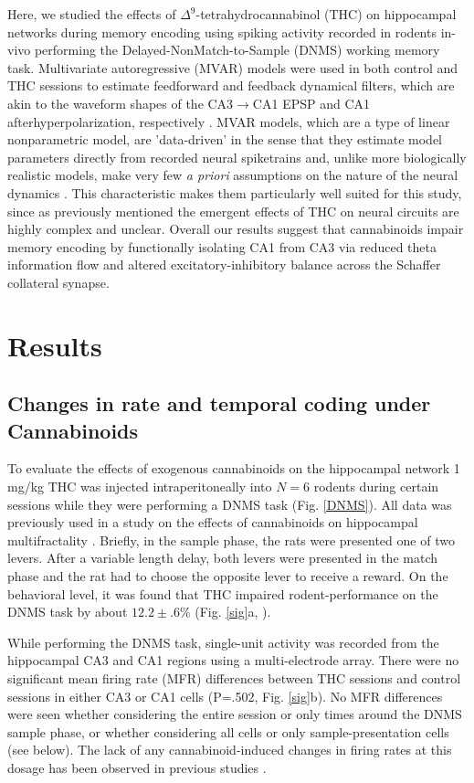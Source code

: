 \documentclass[11pt,a4paper,final]{article}
\begin{document}
Here, we studied the effects of $\Delta^9$-tetrahydrocannabinol (THC) on hippocampal networks during memory encoding using spiking activity recorded in rodents in-vivo performing the Delayed-NonMatch-to-Sample (DNMS) working memory task.
Multivariate autoregressive (MVAR) models were used in both control and THC sessions to estimate feedforward and feedback dynamical filters, which are akin to the waveform shapes of the CA3$\to$CA1 EPSP and CA1 afterhyperpolarization, respectively \citep{sandler14}.
MVAR models, which are a type of linear nonparametric model, are 'data-driven' in the sense that they estimate model parameters directly from recorded neural spiketrains and, unlike more biologically realistic models, make very few \textit{a priori} assumptions on the nature of the neural dynamics \citep{marm04,song09par1}.
This characteristic makes them particularly well suited for this study, since as previously mentioned the emergent effects of THC on neural circuits are highly complex and unclear.
Overall our results suggest that cannabinoids impair memory encoding by functionally isolating CA1 from CA3 via reduced theta information flow and altered excitatory-inhibitory balance across the Schaffer collateral synapse.

\section{Results \label{results}}

    \subsection{Changes in rate and temporal coding under Cannabinoids}

To evaluate the effects of exogenous cannabinoids on the hippocampal network 1 mg/kg THC was injected intraperitoneally into $N=6$ rodents during certain sessions while they were performing a DNMS task (Fig. \ref{DNMS}).
All data was previously used in a study on the effects of cannabinoids on hippocampal multifractality \citep{dustin14,dustin15}.
Briefly, in the sample phase, the rats were presented one of two levers. 
After a variable length delay, both levers were presented in the match phase and the rat had to choose the opposite lever to receive a reward. 
On the behavioral level, it was found that THC impaired rodent-performance on the DNMS task by about $12.2\pm.6\%$ (Fig. \ref{sig}a, \citep{hampson00}).

While performing the DNMS task, single-unit activity was recorded from the hippocampal CA3 and CA1 regions using a multi-electrode array.
There were no significant mean firing rate (MFR) differences between THC sessions and control sessions in either CA3 or CA1 cells (P=.502, Fig. \ref{sig}b).
No MFR differences were seen whether considering the entire session or only times around the DNMS sample phase, or whether considering all cells or only sample-presentation cells (see below).
The lack of any cannabinoid-induced changes in firing rates at this dosage has been observed in previous studies \citep{robbe06,goon10}.
\end{document}
